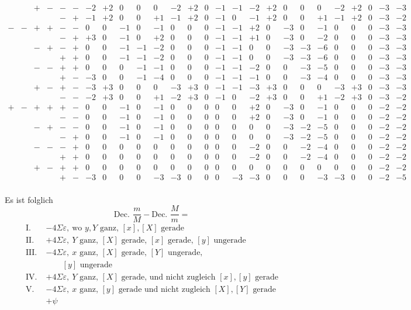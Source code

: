 \[\begin{array}{cccccc|rrrrr|rrrrr|rrrrr|rrrrr}
&&+&-&-&-&-2&+2&0&0&0&-2&+2&0&-1&-1&-2&+2&0&0&0&-2&+2&0&-3&-3\\
&&&&-&+&-1&+2&0&0&+1&-1&+2&0&-1&0&-1&+2&0&0&+1&-1&+2&0&-3&-2\\[4pt]
-&-&+&+&-&-&0&0&-1&0&-1&0&0&0&-1&-1&+2&0&-3&0&-1&0&0&0&-3&-3\\
&&&&-&+&+3&0&-1&0&+2&0&0&0&-1&-1&+1&0&-3&0&-2&0&0&0&-3&-3\\
&&-&+&-&+&0&0&-1&-1&-2&0&0&0&-1&-1&0&0&-3&-3&-6&0&0&0&-3&-3\\
&&&&+&+&0&0&-1&-1&-2&0&0&0&-1&-1&0&0&-3&-3&-6&0&0&0&-3&-3\\
&&-&-&+&+&0&0&0&-1&-1&0&0&0&-1&-1&-2&0&0&-3&-5&0&0&0&-3&-3\\
&&&&+&-&-3&0&0&-1&-4&0&0&0&-1&-1&-1&0&0&-3&-4&0&0&0&-3&-3\\
&&+&-&+&-&-3&+3&0&0&0&-3&+3&0&-1&-1&-3&+3&0&0&0&-3&+3&0&-3&-3\\
&&&&-&-&-2&+3&0&0&+1&-2&+3&0&-1&0&-2&+3&0&0&+1&-2&+3&0&-3&-2\\[4pt]
+&-&+&+&+&-&0&0&-1&0&-1&0&0&0&0&0&+2&0&-3&0&-1&0&0&0&-2&-2\\
&&&&-&-&0&0&-1&0&-1&0&0&0&0&0&+2&0&-3&0&-1&0&0&0&-2&-2\\
&&-&+&-&-&0&0&-1&0&-1&0&0&0&0&0&0&0&-3&-2&-5&0&0&0&-2&-2\\
&&&&-&+&0&0&-1&0&-1&0&0&0&0&0&0&0&-3&-2&-5&0&0&0&-2&-2\\
&&-&-&-&+&0&0&0&0&0&0&0&0&0&0&-2&0&0&-2&-4&0&0&0&-2&-2\\
&&&&+&+&0&0&0&0&0&0&0&0&0&0&-2&0&0&-2&-4&0&0&0&-2&-2\\
&&+&-&+&+&0&0&0&0&0&0&0&0&0&0&0&0&0&0&0&0&0&0&-2&-2\\
&&&&+&-&-3&0&0&0&-3&-3&0&0&0&-3&-3&0&0&0&-3&-3&0&0&-2&-5\\
\end{array}
\]
\endgroup

Es ist folglich
\[
\text{Dec. }\frac mM-\text{Dec. }\frac Mm=
\]
\[
\begin{aligned}
\mathrm{I.}\;&-4\Sigma\varepsilon,\ \text{wo }y,Y\text{ ganz, }[x],[X]\text{ gerade}\\
\mathrm{II.}\;&+4\Sigma\varepsilon,\ Y\text{ ganz, }[X]\text{ gerade, }[x]\text{ gerade, }[y]\text{ ungerade}\\
\mathrm{III.}\;&-4\Sigma\varepsilon,\ x\text{ ganz, }[X]\text{ gerade, }[Y]\text{ ungerade,}\\
&\qquad [y]\text{ ungerade}\\
\mathrm{IV.}\;&+4\Sigma\varepsilon,\ Y\text{ ganz, }[X]\text{ gerade, und nicht zugleich }[x],[y]\text{ gerade}\\
\mathrm{V.}\;&-4\Sigma\varepsilon,\ x\text{ ganz, }[y]\text{ gerade und nicht zugleich }[X],[Y]\text{ gerade}\\
&+\psi
\end{aligned}
\]

